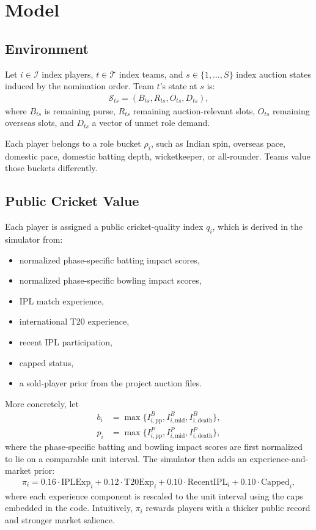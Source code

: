 \documentclass[11pt]{article}
\begin{document}
\section{Model}

\subsection{Environment}

Let \(i\in\mathcal{I}\) index players, \(t\in\mathcal{T}\) index teams, and \(s\in\{1,\dots,S\}\) index auction states induced by the nomination order. Team \(t\)'s state at \(s\) is:
\begin{align}
\mathcal{S}_{ts} = (B_{ts}, R_{ts}, O_{ts}, D_{ts}),
\end{align}
where \(B_{ts}\) is remaining purse, \(R_{ts}\) remaining auction-relevant slots, \(O_{ts}\) remaining overseas slots, and \(D_{ts}\) a vector of unmet role demand.

Each player belongs to a role bucket \(\rho_i\), such as Indian spin, overseas pace, domestic pace, domestic batting depth, wicketkeeper, or all-rounder. Teams value those buckets differently.

\subsection{Public Cricket Value}

Each player is assigned a public cricket-quality index \(q_i\), which is derived in the simulator from:
\begin{itemize}[leftmargin=1.5em]
    \item normalized phase-specific batting impact scores,
    \item normalized phase-specific bowling impact scores,
    \item IPL match experience,
    \item international T20 experience,
    \item recent IPL participation,
    \item capped status,
    \item a sold-player prior from the project auction files.
\end{itemize}

More concretely, let
\begin{align}
b_i &= \max\{I^{B}_{i,\text{pp}}, I^{B}_{i,\text{mid}}, I^{B}_{i,\text{death}}\},\\
p_i &= \max\{I^{P}_{i,\text{pp}}, I^{P}_{i,\text{mid}}, I^{P}_{i,\text{death}}\},
\end{align}
where the phase-specific batting and bowling impact scores are first normalized to lie on a comparable unit interval. The simulator then adds an experience-and-market prior:
\begin{align}
\pi_i
=
0.16\cdot \text{IPLExp}_i
+ 0.12\cdot \text{T20Exp}_i
+ 0.10\cdot \text{RecentIPL}_i
+ 0.10\cdot \text{Capped}_i,
\end{align}
where each experience component is rescaled to the unit interval using the caps embedded in the code. Intuitively, \(\pi_i\) rewards players with a thicker public record and stronger market salience.
\end{document}
